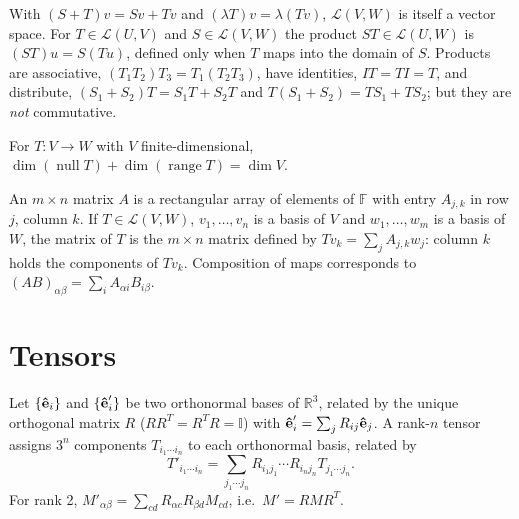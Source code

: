 With $(S+T)v = Sv+Tv$ and $(\lambda T)v = \lambda(Tv)$, $\mathcal{L}(V,W)$ is itself a vector space. For $T\in\mathcal{L}(U,V)$ and $S\in\mathcal{L}(V,W)$ the product $ST\in\mathcal{L}(U,W)$ is $(ST)u = S(Tu)$, defined only when $T$ maps into the domain of $S$. Products are associative, $(T_1T_2)T_3 = T_1(T_2T_3)$, have identities, $IT = TI = T$, and distribute, $(S_1+S_2)T = S_1T+S_2T$ and $T(S_1+S_2) = TS_1+TS_2$; but they are \emph{not} commutative.

\begin{theorem}
For $T:V\to W$ with $V$ finite-dimensional, $\dim(\operatorname{null}T) + \dim(\operatorname{range}T) = \dim V$.
\end{theorem}

\begin{definition}
An $m\times n$ matrix $A$ is a rectangular array of elements of $\mathbb{F}$ with entry $A_{j,k}$ in row $j$, column $k$. If $T\in\mathcal{L}(V,W)$, $v_1,\ldots,v_n$ is a basis of $V$ and $w_1,\ldots,w_m$ is a basis of $W$, the matrix of $T$ is the $m\times n$ matrix defined by $Tv_k = \sum_j A_{j,k}w_j$: column $k$ holds the components of $Tv_k$. Composition of maps corresponds to $(AB)_{\alpha\beta} = \sum_iA_{\alpha i}B_{i\beta}$.
\end{definition}

\section{Tensors}

\begin{definition}
Let $\{\boldsymbol{\hat{\textbf{e}}}_i\}$ and $\{\boldsymbol{\hat{\textbf{e}}}'_i\}$ be two orthonormal bases of $\mathbb{R}^3$, related by the unique orthogonal matrix $R$ ($RR^T = R^TR = \mathbb{I}$) with $\boldsymbol{\hat{\textbf{e}}}'_i = \sum_jR_{ij}\boldsymbol{\hat{\textbf{e}}}_j$. A rank-$n$ tensor assigns $3^n$ components $T_{i_1\cdots i_n}$ to each orthonormal basis, related by
\[
    T'_{i_1\cdots i_n} = \sum_{j_1\cdots j_n}R_{i_1j_1}\cdots R_{i_nj_n}T_{j_1\cdots j_n}.
\]
For rank 2, $M'_{\alpha\beta} = \sum_{cd}R_{\alpha c}R_{\beta d}M_{cd}$, i.e.\ $M' = RMR^T$.
\end{definition}
